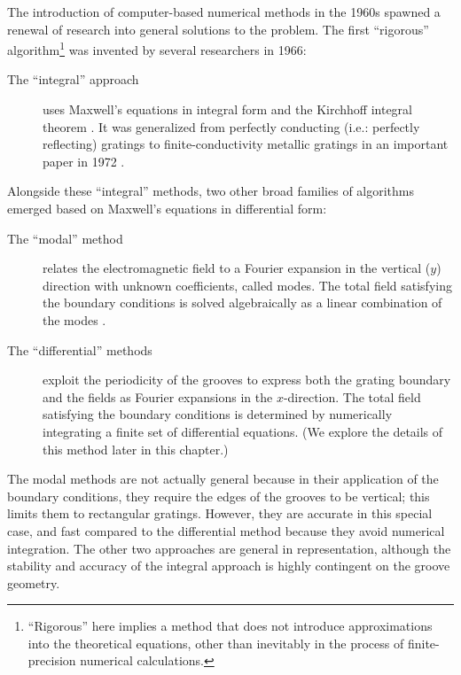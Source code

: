 The introduction of computer-based numerical methods in the 1960s spawned a renewal of research into general solutions to the problem.  The first ``rigorous'' algorithm\footnote{``Rigorous'' here implies a method that does not introduce approximations into the theoretical equations, other than inevitably in the process of finite-precision numerical calculations.} was invented by several researchers in 1966:
\begin{description}
\item[The ``integral'' approach] uses Maxwell's equations in integral form and the Kirchhoff integral theorem \cite{Pet66}\cite{Wir69}\cite{Pav70}.  It was generalized from perfectly conducting (i.e.: perfectly reflecting) gratings to finite-conductivity metallic gratings in an important paper in 1972 \cite{May72}.
\end{description}
Alongside these ``integral'' methods, two other broad families of algorithms emerged based on Maxwell's equations in differential form:
\begin{description}
\item[The ``modal'' method] relates the electromagnetic field to a Fourier expansion in the vertical ($y$) direction with unknown coefficients, called modes. The total field satisfying the boundary conditions is solved algebraically as a linear combination of the modes \cite{Bot81}\cite{Bot81a}\cite{And81}.
\item[The ``differential'' methods] exploit the periodicity of the grooves to express both the grating boundary and the fields as Fourier expansions in the $x$-direction. The total field satisfying the boundary conditions is determined by numerically integrating a finite set of differential equations. (We explore the details of this method later in this chapter.)
\end{description}
The modal methods are not actually general because in their application of the boundary conditions, they require the edges of the grooves to be vertical; this limits them to rectangular gratings.  However, they are accurate in this special case, and fast compared to the differential method because they avoid numerical integration.  
The other two approaches are general in representation, although the stability and accuracy of the integral approach is highly contingent on the groove geometry.


